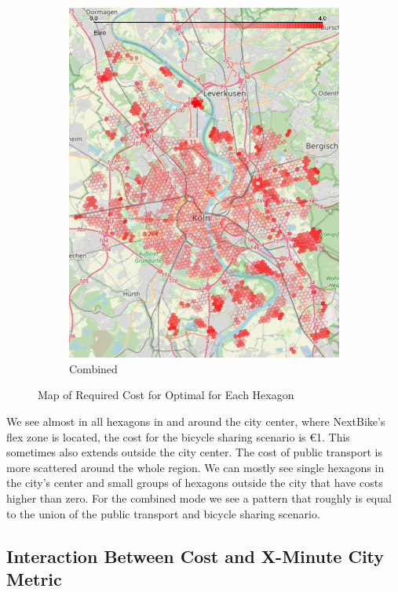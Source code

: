 \begin{figure}
\begin{subfigure}[b]{0.3\textwidth}
         \includegraphics[width=\textwidth]{Figures/results/cost/bicycle_public_transport_cost_map}
         \caption{Combined}
         \label{fig:bicycle_public_transport_cost_map}
     \end{subfigure}
       \caption{Map of Required Cost for Optimal for Each Hexagon}
        \label{fig:cost_map_per_scenario}
\end{figure}
We see almost in all hexagons in and around the city center, where NextBike's flex zone is located, the cost for the bicycle sharing scenario is \euro{1}.
This sometimes also extends outside the city center.
The cost of public transport is more scattered around the whole region. 
We can mostly see single hexagons in the city's center and small groups of hexagons outside the city that have costs higher than zero.
For the combined mode we see a pattern that roughly is equal to the union of the public transport and bicycle sharing scenario.

\subsection{Interaction Between Cost and X-Minute City Metric}
\label{subsec:interaction_between_cost_and_15_minute_city_metric}

